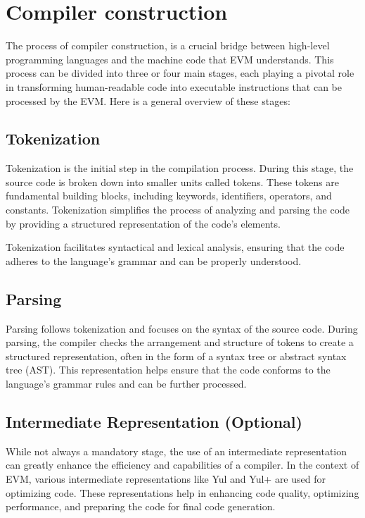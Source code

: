 \section{Compiler construction}
\label{sec:cc}

The process of compiler construction, is a crucial bridge between high-level programming languages and the machine code that EVM understands. This process can be divided into three or four main stages, each playing a pivotal role in transforming human-readable code into executable instructions that can be processed by the EVM. Here is a general overview of these stages:

\subsection{Tokenization}
Tokenization is the initial step in the compilation process. During this stage, the source code is broken down into smaller units called tokens. These tokens are fundamental building blocks, including keywords, identifiers, operators, and constants. Tokenization simplifies the process of analyzing and parsing the code by providing a structured representation of the code's elements.

Tokenization facilitates syntactical and lexical analysis, ensuring that the code adheres to the language's grammar and can be properly understood.

\subsection{Parsing}

Parsing follows tokenization and focuses on the syntax of the source code. During parsing, the compiler checks the arrangement and structure of tokens to create a structured representation, often in the form of a syntax tree or abstract syntax tree (AST). This representation helps ensure that the code conforms to the language's grammar rules and can be further processed.

\subsection{Intermediate Representation (Optional)}

While not always a mandatory stage, the use of an intermediate representation can greatly enhance the efficiency and capabilities of a compiler. In the context of EVM, various intermediate representations like Yul and Yul+ are used for optimizing code. These representations help in enhancing code quality, optimizing performance, and preparing the code for final code generation.

